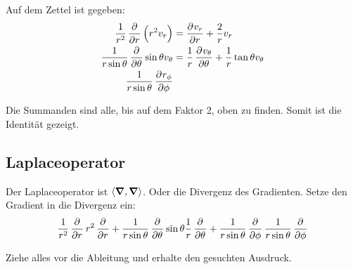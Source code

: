 Auf dem Zettel ist gegeben:
\begin{align*}
	\frac1{r^2} \dpd{}r \del{r^2 v_r} &= \dpd{v_r}r + \frac 2r v_r \\
	\frac1{r\sin\theta} \dpd{}\theta \sin\theta v_\theta &= \frac 1r \dpd{v_\theta}\theta + \frac 1r \tan\theta v_\theta \\
	\frac1{r\sin\theta} \dpd{r_\phi}\phi &
\end{align*}

Die Summanden sind alle, bis auf dem Faktor 2, oben zu finden. Somit ist die
Identität gezeigt.

\subsection{Laplaceoperator}

Der Laplaceoperator ist $\left\langle \boldsymbol{\nabla}, \boldsymbol{\nabla} \right\rangle$. Oder die Divergenz des
Gradienten. Setze den Gradient in die Divergenz ein:
\[
	\frac1{r^2} \dpd{}r r^2 \dpd{}r + \frac1{r\sin\theta} \dpd{}\theta
	\sin\theta \frac 1r \dpd{}\theta + \frac1{r\sin\theta} \dpd{}\phi
	\frac1{r\sin\theta} \dpd{}\phi
\]

Ziehe alles vor die Ableitung und erhalte den gesuchten Ausdruck.


\IfFileExists{\bibliographyfile}{
}{}



